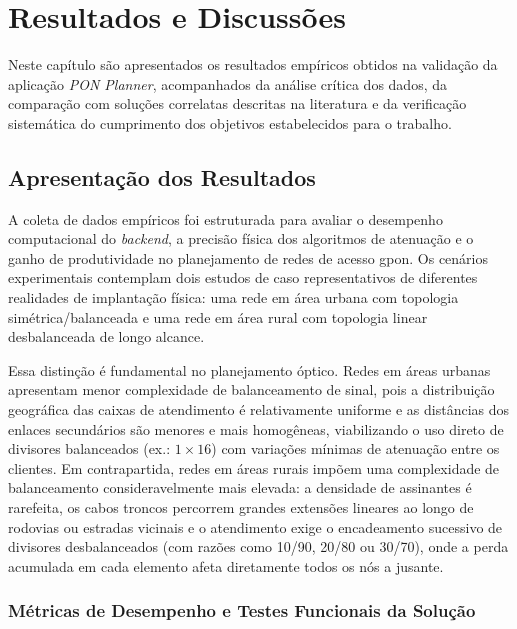 \chapter{Resultados e Discussões}
\label{cap:resultados}

Neste capítulo são apresentados os resultados empíricos obtidos na validação da aplicação \textit{PON Planner}, acompanhados da análise crítica dos dados, da comparação com soluções correlatas descritas na literatura e da verificação sistemática do cumprimento dos objetivos estabelecidos para o trabalho.

\section{Apresentação dos Resultados}
\label{sec:apresentacao_resultados}

A coleta de dados empíricos foi estruturada para avaliar o desempenho computacional do \textit{backend}, a precisão física dos algoritmos de atenuação e o ganho de produtividade no planejamento de redes de acesso \gls{gpon}. Os cenários experimentais contemplam dois estudos de caso representativos de diferentes realidades de implantação física: uma rede em área urbana com topologia simétrica/balanceada e uma rede em área rural com topologia linear desbalanceada de longo alcance.

Essa distinção é fundamental no planejamento óptico. Redes em áreas urbanas apresentam menor complexidade de balanceamento de sinal, pois a distribuição geográfica das caixas de atendimento é relativamente uniforme e as distâncias dos enlaces secundários são menores e mais homogêneas, viabilizando o uso direto de divisores balanceados (ex.: $1\times16$) com variações mínimas de atenuação entre os clientes. Em contrapartida, redes em áreas rurais impõem uma complexidade de balanceamento consideravelmente mais elevada: a densidade de assinantes é rarefeita, os cabos troncos percorrem grandes extensões lineares ao longo de rodovias ou estradas vicinais e o atendimento exige o encadeamento sucessivo de divisores desbalanceados (com razões como 10/90, 20/80 ou 30/70), onde a perda acumulada em cada elemento afeta diretamente todos os nós a jusante.

\subsection{Métricas de Desempenho e Testes Funcionais da Solução}
\label{subsec:desempenho_software}

